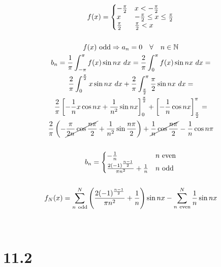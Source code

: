 \begin{gather*}
	f(x) = \left\{\begin{matrix*}[l]
		-\frac{\pi}{2}	& x < -\frac{\pi}{2} \\
		x				& -\frac{\pi}{2} \leq x \leq \frac{\pi}{2} \\
		\frac{\pi}{2}	& \frac{\pi}{2} < x
	\end{matrix*}\right.
	\\
	\\
	f(x)\ \text{odd} \Rightarrow a_n = 0 \quad \forall \quad n \in \mathbb{N}
	\\
	b_n = \frac{1}{\pi} \int_{-\pi}^\pi{f(x) \sin{n x}\ d x} =
	\frac{2}{\pi} \int_0^\pi{f(x) \sin{n x}\ d x} =
	\\
	\frac{2}{\pi} \int_0^{\frac{\pi}{2}}{x \sin{n x}\ d x} +
	\frac{2}{\pi} \int_{\frac{\pi}{2}}^\pi{\frac{\pi}{2} \sin{n x}\ d x} =
	\\
	\frac{2}{\pi} \left[
		-\frac{1}{n} x \cos{n x} +
		\frac{1}{n^2} \sin{n x}
	\right]_0^{\frac{\pi}{2}} +
	\left[
		-\frac{1}{n}\cos{n x}
	\right]_\frac{\pi}{2}^\pi =
	\\
	\frac{2}{\pi} \left(
		- \cancel{\frac{\pi}{2 n} \cos{\frac{n \pi}{2}}} +
		\frac{1}{n^2} \sin{\frac{n \pi}{2}}
	\right) +
	\cancel{\frac{1}{n} \cos{\frac{n \pi}{2}}} -
	\frac{1}{n} \cos{n \pi}
	\\
	\\
	b_n = \left\{\begin{matrix*}[l]
		-\frac{1}{n}											& n\ \text{even} \\
		\frac{2 (-1)^{\frac{n - 1}{2}}}{\pi n^2} + \frac{1}{n}	& n\ \text{odd}
	\end{matrix*}\right.
	\\
	\\
	f_N(x) = \sum_{n\ \text{odd}}^{N}{\left(
		\frac{2 (-1)^{\frac{n - 1}{2}}}{\pi n^2} + \frac{1}{n}
	\right)
	\sin{n x}} -
	\sum_{n\ \text{even}}^N{\frac{1}{n} \sin{n x}}
\end{gather*}


\bigskip
\\


\newpage

\section*{11.2}


